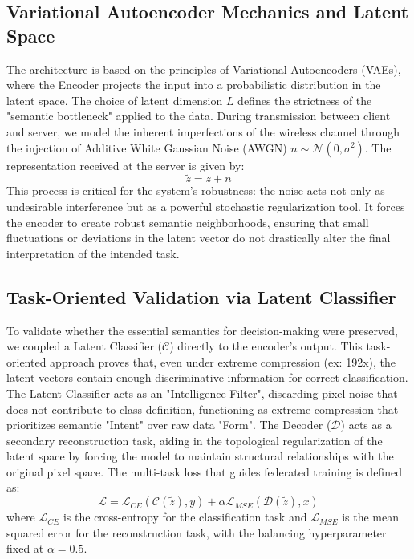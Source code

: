 \documentclass[conference,twocolumn]{IEEEtran}
\begin{document}
\subsection{Variational Autoencoder Mechanics and Latent Space}
The architecture is based on the principles of Variational Autoencoders (VAEs), where the Encoder projects the input into a probabilistic distribution in the latent space. The choice of latent dimension $L$ defines the strictness of the "semantic bottleneck" applied to the data. During transmission between client and server, we model the inherent imperfections of the wireless channel through the injection of Additive White Gaussian Noise (AWGN) $n \sim \mathcal{N}(0, \sigma^2)$. The representation received at the server is given by:
\begin{equation}
    \tilde{z} = z + n
\end{equation}
This process is critical for the system's robustness: the noise acts not only as undesirable interference but as a powerful stochastic regularization tool. It forces the encoder to create robust semantic neighborhoods, ensuring that small fluctuations or deviations in the latent vector do not drastically alter the final interpretation of the intended task.

\subsection{Task-Oriented Validation via Latent Classifier}
To validate whether the essential semantics for decision-making were preserved, we coupled a Latent Classifier ($\mathcal{C}$) directly to the encoder's output. This task-oriented approach proves that, even under extreme compression (ex: 192x), the latent vectors contain enough discriminative information for correct classification. The Latent Classifier acts as an "Intelligence Filter", discarding pixel noise that does not contribute to class definition, functioning as extreme compression that prioritizes semantic "Intent" over raw data "Form". The Decoder ($\mathcal{D}$) acts as a secondary reconstruction task, aiding in the topological regularization of the latent space by forcing the model to maintain structural relationships with the original pixel space. The multi-task loss that guides federated training is defined as:
\begin{equation}
    \mathcal{L} = \mathcal{L}_{CE}(\mathcal{C}(\tilde{z}), y) + \alpha \mathcal{L}_{MSE}(\mathcal{D}(\tilde{z}), x)
\end{equation}
where $\mathcal{L}_{CE}$ is the cross-entropy for the classification task and $\mathcal{L}_{MSE}$ is the mean squared error for the reconstruction task, with the balancing hyperparameter fixed at $\alpha=0.5$.
\end{document}
